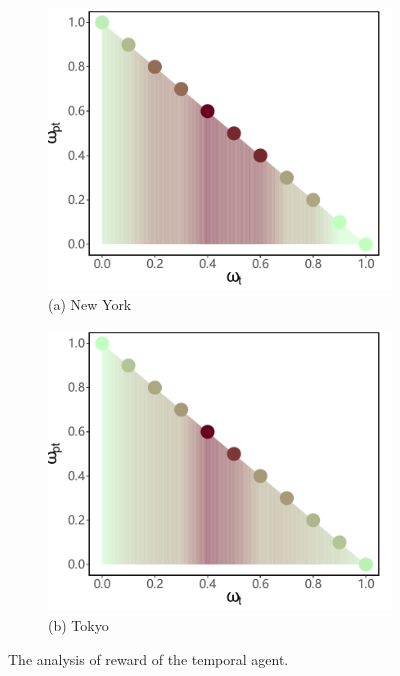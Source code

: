 \documentclass[letterpaper]{article} %
\begin{document}
\begin{figure}[!th]
\centering
\begin{subfigure}{.24\textwidth}
  \centering
  \includegraphics[width=\linewidth]{fig9_nyc.pdf}
  \scriptsize (a) New York
\end{subfigure}%
\begin{subfigure}{.24\textwidth}
  \centering
  \includegraphics[width=\linewidth]{fig9_tky.pdf}
  \scriptsize (b) Tokyo
\end{subfigure}
\caption{The analysis of reward of the temporal agent.}
\label{fig: temporal reward}
\end{figure}
\end{document}
